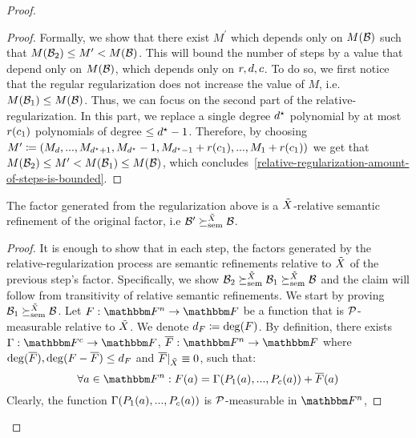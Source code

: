 \begin{proof}
\begin{proof}
        Formally, we show that there exist $M^{\prime}$ which depends only on $M(\mathcal{B})$ such that $M(\mathcal{B}_2) \leq M^{\prime} < M(\mathcal{B})$.
        This will bound the number of steps by a value that depend only on $M(\mathcal{B})$, which depends only on ${{{r}}}, d, c$.
        To do so, we first notice that the regular regularization does not increase the value of $M$, i.e. $M(\mathcal{B}_1) \leq M(\mathcal{B})$.
        Thus, we can focus on the second part of the relative-regularization.
        In this part, we replace a single degree $d^{\star}$ polynomial by at most ${{{r}}}(c_1)$ polynomials of degree $\leq d^{\star} - 1$.
        Therefore, by choosing $M^{\prime} \coloneqq (M_{d}, ..., M_{d^{\star}+1}, M_{d^{\star}}-1, M_{d^{\star}-1}+{{{r}}}(c_1),...,M_1+{{{r}}}(c_1))$
        we get that $M(\mathcal{B}_2) \leq M^{\prime} < M(\mathcal{B}_1) \leq M(\mathcal{B})$, which concludes~\ref{relative-regularization-amount-of-steps-is-bounded}.
    \end{proof}
    \begin{claim}
        The factor generated from the regularization above is a ${\tilde{X}}$-relative semantic refinement of the original factor, i.e $\mathcal{B}^\prime \succeq^{{\tilde{X}}}_{\text{sem}} \mathcal{B}$.
    \end{claim}
    \begin{proof}
        It is enough to show that in each step, the factors generated by the relative-regularization process are semantic refinements relative to ${\tilde{X}}$ of the previous step's factor.
        Specifically, we show $\mathcal{B}_{2} \succeq^{{\tilde{X}}}_{\text{sem}} \mathcal{B}_{1} \succeq^{{\tilde{X}}}_{\text{sem}} \mathcal{B}$ and the claim will follow from transitivity of relative semantic refinements.
        \newline
        We start by proving $\mathcal{B}_1 \succeq^{{\tilde{X}}}_{\text{sem}} \mathcal{B}$.
        Let $\funcdef{\genfunc}{\field}{\basefield}$ be a function that is $\genpolyset$-measurable relative to ${\tilde{X}}$.
        We denote $\degree_{\genfunc} \definedas \deg(\genfunc)$.
        By definition, there exists $\funcdef{\Gamma}{\basefield^c}{\basefield}$,
        $\funcdef{\relativeremainder{\genfunc}}{\field}{\basefield}$ where $\deg(\relativeremainder{\genfunc}), \deg(\genfunc - \relativeremainder{\genfunc}) \leq \degree_{\genfunc}$ and $\restrictfunc{\relativeremainder{\genfunc}}{\variety} \equiv 0$, such that:
        \[
            \forall a \in \field: \genfunc(a) = \Gamma(\genpoly_1(a),...,\genpoly_c(a)) + \relativeremainder{\genfunc}(a)
        \]
        Clearly, the function $\Gamma(\genpoly_1(a),...,\genpoly_c(a))$ is $\genpolyset$-measurable in $\field$,

\end{proof}
\end{proof}
